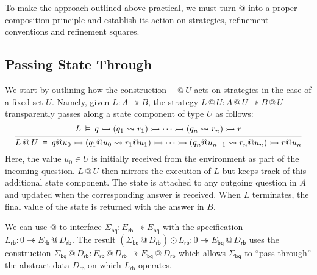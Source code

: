 \documentclass[acmsmall,screen,review,nonacm]{acmart}
\newcommand{\kw}[1]{\ensuremath{ \mathsf{#1} }}
\newcommand{\emptysig}{0}
\begin{document}
To make the approach outlined above practical,
we must turn $@$ into a proper composition principle
and establish its action on
strategies,
refinement conventions and
refinement squares.


\subsection{Passing State Through} \label{sec:overview:slift} %

We start by
outlining how the construction ${-} \mathbin@ U$
acts on strategies
in the case of a fixed set $U$.
Namely,
given $L : A \twoheadrightarrow B$,
the strategy
$
  L \mathbin@ U : A \mathbin@ U \twoheadrightarrow B \mathbin@ U
$
transparently passes along
a state component of type $U$ as follows:
\begin{equation} \label{eqn:slift}
  \begin{prooftree}
  \hypo{
  L \:\vDash\: q \rightarrowtail
    (q_1 \leadsto r_1) \rightarrowtail
    \cdots \rightarrowtail
    (q_n \leadsto r_n) \rightarrowtail
    r
  }
  \infer1{
  L \mathbin@ U \:\vDash\: q@u_0 \rightarrowtail
    (q_1@u_0 \leadsto r_1@u_1) \rightarrowtail
    \cdots \rightarrowtail
    (q_n@u_{n-1} \leadsto r_n@u_n) \rightarrowtail
    r@u_n
  }
  \end{prooftree}
\end{equation}
Here, the value $u_0 \in U$
is initially received from the environment as part of the incoming question.
$L \mathbin@ U$ then mirrors the execution of $L$
but keeps track of this additional state component.
The state is attached to any outgoing question in $A$
and updated when the corresponding answer is received.
When $L$ terminates,
the final value of the state is returned with the answer in $B$.


\begin{example} \label{ex:abspeclift} %
We can use $\mathbin@$ to interface
$\Sigma_\kw{bq} : E_\kw{rb} \twoheadrightarrow E_\kw{bq}$ with the specification
$L_\kw{rb} : \emptysig \twoheadrightarrow E_\kw{rb} \mathbin@ D_\kw{rb}$.
The result
$
  (\Sigma_\kw{bq} \mathbin@ D_\kw{rb}) \odot L_\kw{rb} :
  \emptysig \twoheadrightarrow E_\kw{bq} \mathbin@ D_\kw{rb}
$
uses the construction
$\Sigma_\kw{bq} \mathbin@ D_\kw{rb} :
 E_\kw{rb} \mathbin@ D_\kw{rb}
 \twoheadrightarrow
 E_\kw{bq} \mathbin@ D_\kw{rb}$
which allows $\Sigma_\kw{bq}$ to
``pass through'' the abstract data $D_\kw{rb}$
on which $L_\kw{rb}$ operates.
\end{example}
\end{document}
